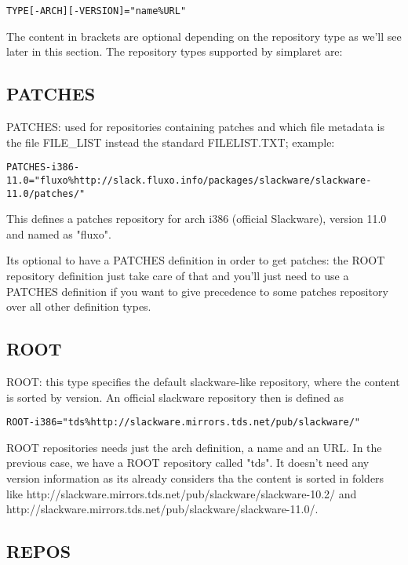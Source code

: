 \documentclass{article}
\begin{document}
\begin{verbatim}
TYPE[-ARCH][-VERSION]="name%URL"
\end{verbatim}

The content in brackets are optional depending on the repository type as we'll see later in this section. The repository types supported by simplaret are:

\subsection{PATCHES}

PATCHES: used for repositories containing patches and which file metadata is the file FILE\_LIST instead the standard FILELIST.TXT; example:

\begin{verbatim}
PATCHES-i386-11.0="fluxo%http://slack.fluxo.info/packages/slackware/slackware-11.0/patches/"
\end{verbatim}

This defines a patches repository for arch i386 (official Slackware), version 11.0 and named as "fluxo".

Its optional to have a PATCHES definition in order to get patches: the ROOT repository definition just take care of that and you'll just need to use a PATCHES definition if you want to give precedence to some patches repository over all other definition types.

\subsection{ROOT}

ROOT: this type specifies the default slackware-like repository, where the content is sorted by version. An official slackware repository then is defined as

\begin{verbatim}
ROOT-i386="tds%http://slackware.mirrors.tds.net/pub/slackware/"
\end{verbatim}

ROOT repositories needs just the arch definition, a name and an URL. In the previous case, we have a ROOT repository called "tds". It doesn't need any version information as its already considers tha the content is sorted in folders like http://slackware.mirrors.tds.net/pub/slackware/slackware-10.2/ and http://slackware.mirrors.tds.net/pub/slackware/slackware-11.0/.

\subsection{REPOS}
\end{document}
